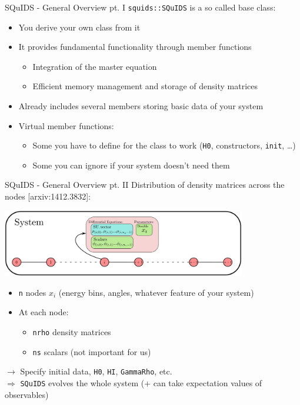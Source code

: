 \documentclass[]{beamer}
\begin{document}
\begin{frame}{SQuIDS - General Overview pt. I}
  \texttt{squids::SQuIDS} is a so called base class:
  \begin{itemize}
    \item You derive your own class from it 
    \item It provides fundamental functionality through member functions
    \begin{itemize}
      \item Integration of the master equation
      \item Efficient memory management and storage of density matrices
    \end{itemize}
    \item Already includes several members storing basic data of your system 
    \item Virtual member functions:
    \begin{itemize}
      \item Some you have to define for the class to work (\texttt{H0}, constructors, \texttt{init}, \ldots)
      \item Some you can ignore if your system doesn't need them
    \end{itemize}
  \end{itemize}
\end{frame}

\begin{frame}{SQuIDS - General Overview pt. II}
  Distribution of density matrices across the nodes [arxiv:1412.3832]:
  \begin{center}
    \includegraphics[width=0.8\textwidth]{figs/squids_nodes.png}
  \end{center}
  \begin{itemize}
    \item \texttt{n} nodes \(x_i\) (energy bins, angles, whatever feature of your system)
    \item At each node:
    \begin{itemize}
      \item \texttt{nrho} density matrices
      \item \texttt{ns} scalars (not important for us)
    \end{itemize}
  \end{itemize}
  \(\rightarrow\) Specify initial data, \texttt{H0}, \texttt{HI}, \texttt{GammaRho}, etc. \\
  \(\Rightarrow\) \texttt{SQuIDS} evolves the whole system (+ can take expectation values of observables)
\end{frame}
\end{document}
